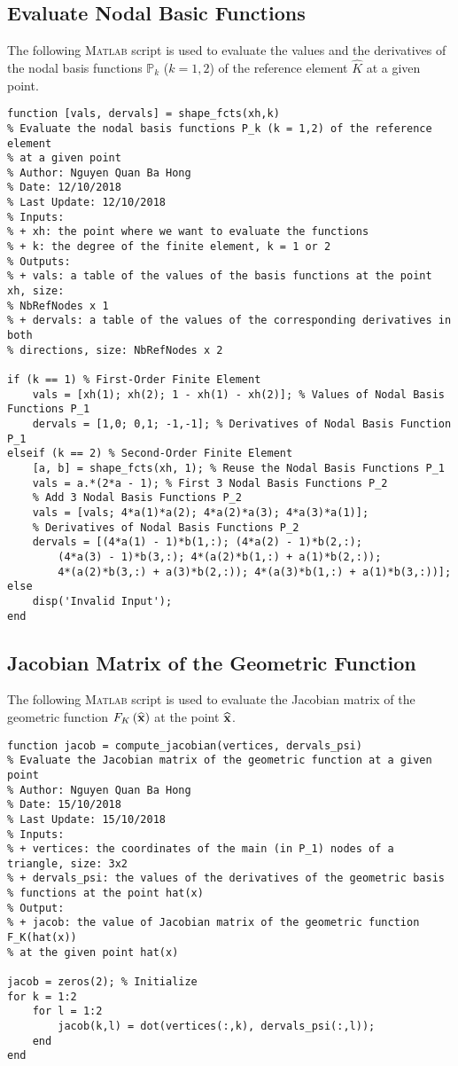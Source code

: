 \documentclass[11pt,a4paper,center,notitlepage]{article}
\numberwithin{equation}{section}
\begin{document}
\subsection{Evaluate Nodal Basic Functions}\label{sec8.3}
The following \textsc{Matlab} script is used to evaluate the values and the derivatives of the nodal basis functions $\mathbb{P}_k$ ($k=1,2$) of the reference element $\widehat{K}$ at a given point.
\begin{verbatim}
function [vals, dervals] = shape_fcts(xh,k)
% Evaluate the nodal basis functions P_k (k = 1,2) of the reference element
% at a given point
% Author: Nguyen Quan Ba Hong
% Date: 12/10/2018
% Last Update: 12/10/2018
% Inputs:
% + xh: the point where we want to evaluate the functions
% + k: the degree of the finite element, k = 1 or 2
% Outputs:
% + vals: a table of the values of the basis functions at the point xh, size:
% NbRefNodes x 1
% + dervals: a table of the values of the corresponding derivatives in both
% directions, size: NbRefNodes x 2

if (k == 1) % First-Order Finite Element
    vals = [xh(1); xh(2); 1 - xh(1) - xh(2)]; % Values of Nodal Basis Functions P_1
    dervals = [1,0; 0,1; -1,-1]; % Derivatives of Nodal Basis Function P_1
elseif (k == 2) % Second-Order Finite Element
    [a, b] = shape_fcts(xh, 1); % Reuse the Nodal Basis Functions P_1
    vals = a.*(2*a - 1); % First 3 Nodal Basis Functions P_2
    % Add 3 Nodal Basis Functions P_2
    vals = [vals; 4*a(1)*a(2); 4*a(2)*a(3); 4*a(3)*a(1)];
    % Derivatives of Nodal Basis Functions P_2
    dervals = [(4*a(1) - 1)*b(1,:); (4*a(2) - 1)*b(2,:);
        (4*a(3) - 1)*b(3,:); 4*(a(2)*b(1,:) + a(1)*b(2,:));
        4*(a(2)*b(3,:) + a(3)*b(2,:)); 4*(a(3)*b(1,:) + a(1)*b(3,:))];
else
    disp('Invalid Input');
end
\end{verbatim}

\subsection{Jacobian Matrix of the Geometric Function}\label{sec8.4}
The following \textsc{Matlab} script is used to evaluate the Jacobian matrix of the geometric function $F_K\left(\widehat{\bf x}\right)$ at the point $\widehat{\bf x}$.
\begin{verbatim}
function jacob = compute_jacobian(vertices, dervals_psi)
% Evaluate the Jacobian matrix of the geometric function at a given point
% Author: Nguyen Quan Ba Hong
% Date: 15/10/2018
% Last Update: 15/10/2018
% Inputs:
% + vertices: the coordinates of the main (in P_1) nodes of a triangle, size: 3x2
% + dervals_psi: the values of the derivatives of the geometric basis
% functions at the point hat(x)
% Output:
% + jacob: the value of Jacobian matrix of the geometric function F_K(hat(x))
% at the given point hat(x)

jacob = zeros(2); % Initialize
for k = 1:2
    for l = 1:2
        jacob(k,l) = dot(vertices(:,k), dervals_psi(:,l));
    end
end
\end{verbatim}
\end{document}
